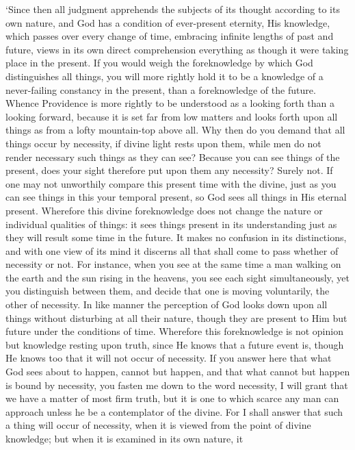 `Since then all judgment apprehends the subjects of its thought
according to its own nature, and God has a condition of ever-present
eternity, His knowledge, which passes over every change of time,
embracing infinite lengths of past and future, views in its own direct
comprehension everything as though it were taking place in the
present. If you would weigh the foreknowledge by which God
distinguishes all things, you will more rightly hold it to be a
knowledge of a never-failing constancy in the present, than a
foreknowledge of the future. Whence Providence is more rightly to be
understood as a looking forth than a looking forward, because it is
set far from low matters and looks forth upon all things as from a
lofty mountain-top above all. Why then do you demand that all things
occur by necessity, if divine light rests upon them, while men do not
render necessary such things as they can see? Because you can see
things of the present, does your sight therefore put upon them any
necessity?  Surely not. If one may not unworthily compare
this present time with the divine, just as you can see things in this
your temporal present, so God sees all things in His eternal present.
Wherefore this divine foreknowledge does not change the nature or
individual qualities of things: it sees things present in its
understanding just as they will result some time in the future. It
makes no confusion in its distinctions, and with one view of its mind
it discerns all that shall come to pass whether of necessity or not.
For instance, when you see at the same time a man walking on the earth
and the sun rising in the heavens, you see each sight simultaneously,
yet you distinguish between them, and decide that one is moving
voluntarily, the other of necessity. In like manner the perception of
God looks down upon all things without disturbing at all their nature,
though they are present to Him but future under the conditions of
time. Wherefore this foreknowledge is not opinion but knowledge
resting upon truth, since He knows that a future event is, though He
knows too that it will not occur of necessity. If you answer here that
what God sees about to happen, cannot but happen, and that what cannot
but happen is bound by necessity, you fasten me down to the word
necessity, I will grant that we have a matter of most firm truth, but
it is one to which scarce any man can approach unless he be a
contemplator of the divine. For I shall answer that such a thing
 will occur of necessity, when it is viewed from the point
of divine knowledge; but when it is examined in its own nature, it
